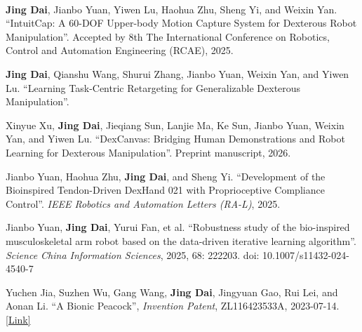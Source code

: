 
\vspace{-17mm}

\begin{cventries}
    \cventry
    {} %
    {\ } %
    {\ } %
    {} %
    {
        \begin{cvitemize2}
            \item \textbf{Jing Dai}, Jianbo Yuan, Yiwen Lu, Haohua Zhu, Sheng Yi, and Weixin Yan. ``IntuitCap: A 60-DOF Upper-body Motion Capture System for Dexterous Robot Manipulation''. Accepted by 8th The International Conference on Robotics, Control and Automation Engineering (RCAE), 2025.
            \item \textbf{Jing Dai}, Qianshu Wang, Shurui Zhang, Jianbo Yuan, Weixin Yan, and Yiwen Lu. ``Learning Task-Centric Retargeting for Generalizable Dexterous Manipulation''.
            \item Xinyue Xu, \textbf{Jing Dai}, Jieqiang Sun, Lanjie Ma, Ke Sun, Jianbo Yuan, Weixin Yan, and Yiwen Lu. ``DexCanvas: Bridging Human Demonstrations and Robot Learning for Dexterous Manipulation''. Preprint manuscript, 2026.
            \item Jianbo Yuan, Haohua Zhu, \textbf{Jing Dai}, and Sheng Yi. ``Development of the Bioinspired Tendon-Driven DexHand 021 with Proprioceptive Compliance Control''. \textit{IEEE Robotics and Automation Letters (RA-L)}, 2025.
            \item Jianbo Yuan, \textbf{Jing Dai}, Yurui Fan, et al. ``Robustness study of the bio-inspired musculoskeletal arm robot based on the data-driven iterative learning algorithm''. \textit{Science China Information Sciences}, 2025, 68: 222203. doi: 10.1007/s11432-024-4540-7
            \item Yuchen Jia, Suzhen Wu, Gang Wang, \textbf{Jing Dai}, Jingyuan Gao, Rui Lei, and Aonan Li. ``A Bionic Peacock'', \textit{Invention Patent}, ZL116423533A, 2023-07-14. \href{https://pss-system.cponline.cnipa.gov.cn/documents/detail?prevPageTit=changgui}{\textcolor{link}{[Link]}}
        \end{cvitemize2}
    }
\end{cventries}